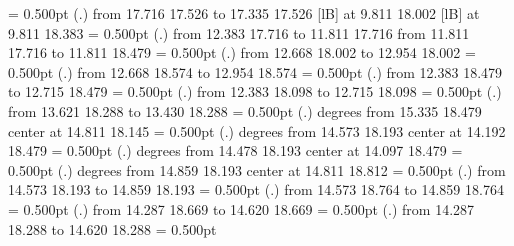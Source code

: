 {{}%
%
%
\linethickness= 0.500pt
\setplotsymbol ({\thinlinefont .})
{\color[rgb]{0,0,0}\putrule from 17.716 17.526 to 17.335 17.526
}%
%
%
 [lB] at  9.811 18.002
%
%
 [lB] at  9.811 18.383
%
%
\linethickness= 0.500pt
\setplotsymbol ({\thinlinefont .})
{\color[rgb]{0,0,0}\putrule from 12.383 17.716 to 11.811 17.716
\putrule from 11.811 17.716 to 11.811 18.479
}%
%
%
\linethickness= 0.500pt
\setplotsymbol ({\thinlinefont .})
{\color[rgb]{0,0,0}\putrule from 12.668 18.002 to 12.954 18.002
}%
%
%
\linethickness= 0.500pt
\setplotsymbol ({\thinlinefont .})
{\color[rgb]{0,0,0}\putrule from 12.668 18.574 to 12.954 18.574
}%
%
%
\linethickness= 0.500pt
\setplotsymbol ({\thinlinefont .})
{\color[rgb]{0,0,0}\putrule from 12.383 18.479 to 12.715 18.479
}%
%
%
\linethickness= 0.500pt
\setplotsymbol ({\thinlinefont .})
{\color[rgb]{0,0,0}\putrule from 12.383 18.098 to 12.715 18.098
}%
%
%
\linethickness= 0.500pt
\setplotsymbol ({\thinlinefont .})
{\color[rgb]{0,0,0}\putrule from 13.621 18.288 to 13.430 18.288
}%
%
%
\linethickness= 0.500pt
\setplotsymbol ({\thinlinefont .})
{\color[rgb]{0,0,0} degrees from 15.335 18.479 center at 14.811 18.145
}%
%
%
\linethickness= 0.500pt
\setplotsymbol ({\thinlinefont .})
{\color[rgb]{0,0,0} degrees from 14.573 18.193 center at 14.192 18.479
}%
%
%
\linethickness= 0.500pt
\setplotsymbol ({\thinlinefont .})
{\color[rgb]{0,0,0} degrees from 14.478 18.193 center at 14.097 18.479
}%
%
%
\linethickness= 0.500pt
\setplotsymbol ({\thinlinefont .})
{\color[rgb]{0,0,0} degrees from 14.859 18.193 center at 14.811 18.812
}%
%
%
\linethickness= 0.500pt
\setplotsymbol ({\thinlinefont .})
{\color[rgb]{0,0,0}\putrule from 14.573 18.193 to 14.859 18.193
}%
%
%
\linethickness= 0.500pt
\setplotsymbol ({\thinlinefont .})
{\color[rgb]{0,0,0}\putrule from 14.573 18.764 to 14.859 18.764
}%
%
%
\linethickness= 0.500pt
\setplotsymbol ({\thinlinefont .})
{\color[rgb]{0,0,0}\putrule from 14.287 18.669 to 14.620 18.669
}%
%
%
\linethickness= 0.500pt
\setplotsymbol ({\thinlinefont .})
{\color[rgb]{0,0,0}\putrule from 14.287 18.288 to 14.620 18.288
}%
%
%
\linethickness= 0.500pt
}
